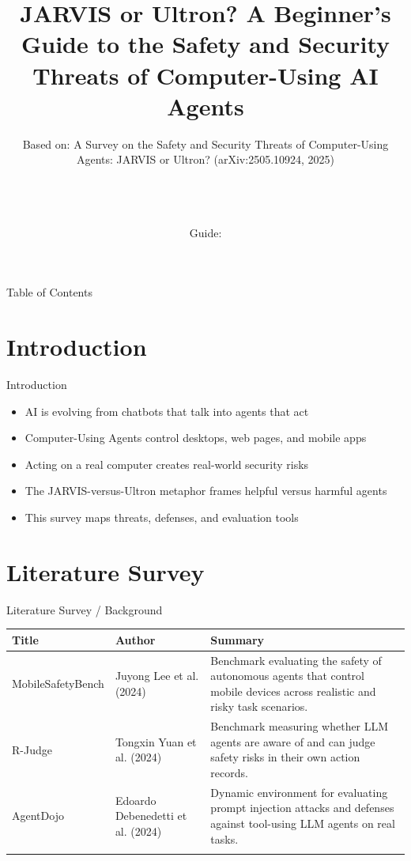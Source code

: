 \documentclass[10pt]{beamer}
\title[B.Tech Seminar]{JARVIS or Ultron? A Beginner's Guide to the Safety and Security Threats of Computer-Using AI Agents}
\subtitle{Based on: A Survey on the Safety and Security Threats of Computer-Using Agents: JARVIS or Ultron? (arXiv:2505.10924, 2025)}
\author[\studentname\ (\shortinst)]{\studentname \\ \small \rollno \\ \small \rollclass \\ \small Guide: \guidename}
\institute[]{\deptname \\ \collegename}
\date{\seminardate}
\begin{document}
\begin{frame}[plain]
  \titlepage
\end{frame}

\begin{frame}{Table of Contents}
  \tableofcontents
\end{frame}

\section{Introduction}
\begin{frame}{Introduction}
\begin{itemize}
  \item AI is evolving from chatbots that talk into agents that act
  \item Computer-Using Agents control desktops, web pages, and mobile apps
  \item Acting on a real computer creates real-world security risks
  \item The JARVIS-versus-Ultron metaphor frames helpful versus harmful agents
  \item This survey maps threats, defenses, and evaluation tools
\end{itemize}
\end{frame}

\section{Literature Survey}
\begin{frame}{Literature Survey / Background}
  \small
  \begin{tabular}{@{}p{2.7cm}p{2.3cm}p{5.6cm}@{}}
    \toprule
    \textbf{Title} & \textbf{Author} & \textbf{Summary} \\
    \midrule
    MobileSafetyBench & Juyong Lee et al. (2024) & Benchmark evaluating the safety of autonomous agents that control mobile devices across realistic and risky task scenarios. \\
    \addlinespace
    R-Judge & Tongxin Yuan et al. (2024) & Benchmark measuring whether LLM agents are aware of and can judge safety risks in their own action records. \\
    \addlinespace
    AgentDojo & Edoardo Debenedetti et al. (2024) & Dynamic environment for evaluating prompt injection attacks and defenses against tool-using LLM agents on real tasks. \\
    \addlinespace
    \bottomrule
  \end{tabular}
\end{frame}
\end{document}
